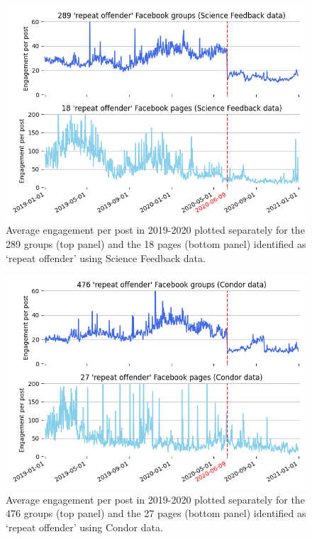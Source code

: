 \documentclass[review]{elsarticle}
\begin{document}
\begin{figure}[!h]
\centering
\includegraphics[scale=0.5]{./../figure/supplementary_engagement_groups_and_pages_sf.png}
\caption{
Average engagement per post in 2019-2020 plotted separately for the 289 groups (top panel) and the 18 pages (bottom panel) identified as `repeat offender' using Science Feedback data.
}
\label{engagement_groups_and_pages_sf}
\end{figure}

\begin{figure}[!h]
\centering
\includegraphics[scale=0.5]{./../figure/supplementary_engagement_groups_and_pages_condor.png}
\caption{
Average engagement per post in 2019-2020 plotted separately for the 476 groups (top panel) and the 27 pages (bottom panel) identified as `repeat offender' using Condor data.
}
\label{engagement_groups_and_pages_condor}
\end{figure}
\end{document}
